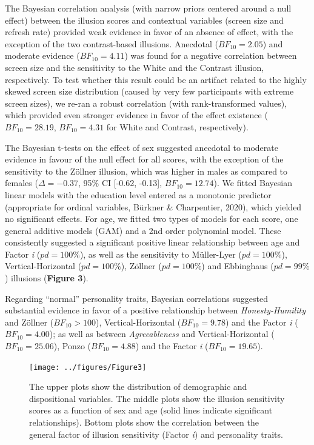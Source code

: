 \documentclass[
  man,floatsintext]{apa6}
\begin{document}
The Bayesian correlation analysis (with narrow priors centered around a null effect) between the illusion scores and contextual variables (screen size and refresh rate) provided weak evidence in favor of an absence of effect, with the exception of the two contrast-based illusions. Anecdotal (\(BF_{10} = 2.05\)) and moderate evidence (\(BF_{10} = 4.11\)) was found for a negative correlation between screen size and the sensitivity to the White and the Contrast illusion, respectively. To test whether this result could be an artifact related to the highly skewed screen size distribution (caused by very few participants with extreme screen sizes), we re-ran a robust correlation (with rank-transformed values), which provided even stronger evidence in favor of the effect existence (\(BF_{10} = 28.19\), \(BF_{10} = 4.31\) for White and Contrast, respectively).

The Bayesian t-tests on the effect of sex suggested anecdotal to moderate evidence in favour of the null effect for all scores, with the exception of the sensitivity to the Zöllner illusion, which was higher in males as compared to females (\(\Delta=-0.37\), 95\% CI {[}-0.62, -0.13{]}, \(BF_{10} = 12.74\)). We fitted Bayesian linear models with the education level entered as a monotonic predictor (appropriate for ordinal variables, Bürkner \& Charpentier, 2020), which yielded no significant effects. For age, we fitted two types of models for each score, one general additive models (GAM) and a 2nd order polynomial model. These consistently suggested a significant positive linear relationship between age and Factor \emph{i} (\(pd=100\%\)), as well as the sensitivity to Müller-Lyer (\(pd=100\%\)), Vertical-Horizontal (\(pd=100\%\)), Zöllner (\(pd=100\%\)) and Ebbinghaus (\(pd=99\%\)) illusions (\textbf{Figure 3}).

Regarding ``normal'' personality traits, Bayesian correlations suggested substantial evidence in favor of a positive relationship between \emph{Honesty-Humility} and Zöllner (\(BF_{10} > 100\)), Vertical-Horizontal (\(BF_{10} = 9.78\)) and the Factor \emph{i} (\(BF_{10} = 4.00\)); as well as between \emph{Agreeableness} and Vertical-Horizontal (\(BF_{10} = 25.06\)), Ponzo (\(BF_{10} = 4.88\)) and the Factor \emph{i} (\(BF_{10} = 19.65\)).

\begin{figure}
\texttt{[image: ../figures/Figure3]} \caption{The upper plots show the distribution of demographic and dispositional variables. The middle plots show the illusion sensitivity scores as a function of sex and age (solid lines indicate significant relationships). Bottom plots show the correlation between the general factor of illusion sensitivity (Factor \textit{i}) and personality traits.}\label{fig:unnamed-chunk-4}
\end{figure}
\end{document}
